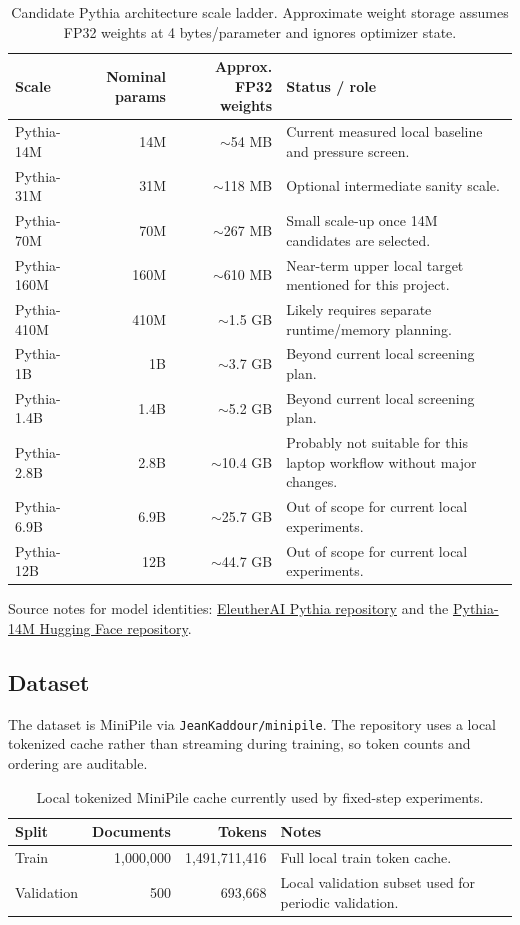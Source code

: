 \documentclass[10pt]{article}
\newcommand{\code}[1]{\texttt{#1}}
\begin{document}
\begin{table}[H]
\centering
\caption{Candidate Pythia architecture scale ladder. Approximate weight storage assumes FP32 weights at 4 bytes/parameter and ignores optimizer state.}
\begin{tabularx}{\textwidth}{lrrX}
\toprule
Scale & Nominal params & Approx. FP32 weights & Status / role \\
\midrule
Pythia-14M & 14M & $\sim$54 MB & Current measured local baseline and pressure screen. \\
Pythia-31M & 31M & $\sim$118 MB & Optional intermediate sanity scale. \\
Pythia-70M & 70M & $\sim$267 MB & Small scale-up once 14M candidates are selected. \\
Pythia-160M & 160M & $\sim$610 MB & Near-term upper local target mentioned for this project. \\
Pythia-410M & 410M & $\sim$1.5 GB & Likely requires separate runtime/memory planning. \\
Pythia-1B & 1B & $\sim$3.7 GB & Beyond current local screening plan. \\
Pythia-1.4B & 1.4B & $\sim$5.2 GB & Beyond current local screening plan. \\
Pythia-2.8B & 2.8B & $\sim$10.4 GB & Probably not suitable for this laptop workflow without major changes. \\
Pythia-6.9B & 6.9B & $\sim$25.7 GB & Out of scope for current local experiments. \\
Pythia-12B & 12B & $\sim$44.7 GB & Out of scope for current local experiments. \\
\bottomrule
\end{tabularx}
\end{table}

Source notes for model identities: \href{https://github.com/EleutherAI/pythia}{EleutherAI Pythia repository} and the \href{https://huggingface.co/EleutherAI/pythia-14m-deduped}{Pythia-14M Hugging Face repository}.

\subsection*{Dataset}

The dataset is MiniPile via \code{JeanKaddour/minipile}. The repository uses a local tokenized cache rather than streaming during training, so token counts and ordering are auditable.

\begin{table}[H]
\centering
\caption{Local tokenized MiniPile cache currently used by fixed-step experiments.}
\begin{tabular}{lrrl}
\toprule
Split & Documents & Tokens & Notes \\
\midrule
Train & 1,000,000 & 1,491,711,416 & Full local train token cache. \\
Validation & 500 & 693,668 & Local validation subset used for periodic validation. \\
\bottomrule
\end{tabular}
\end{table}
\end{document}
